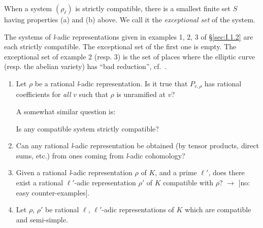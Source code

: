 When a system $(\rho_\ell)$ is strictly compatible, there is a
smallest finite set $S$ having properties (a) and (b) above.  We call
it the \emph{exceptional set} of the system.

\begin{examples}
The systems of \textit{l}-adic representations given in examples 1, 2,
3 of \S\ref{sec:I.1.2} are each strictly compatible.  The exceptional
set of the first one is empty.  The exceptional set of example 2
(resp. 3) is the set of places where the elliptic curve (resp. the
abelian variety) has ``bad reduction'', cf.~\cite{serre-tate-good}.
\end{examples}

\begin{enumerate}[label=\arabic*.,leftmargin=2.2em,itemsep=0.15ex,topsep=0.4ex]
\item Let $\rho$ be a rational \textit{l}-adic representation.  Is it
true that $P_{v,\rho}$ has rational coefficients for \emph{all} $v$
such that $\rho$ is unramified at $v$?

A somewhat similar question is:

Is any compatible system strictly compatible?

\item Can any rational \textit{l}-adic representation be obtained (by
tensor products, direct sums, etc.) from ones coming from
\textit{l}-adic cohomology?

\item Given a rational \textit{l}-adic representation $\rho$ of $K$,
and a prime $\ell'$, does there exist a rational $\ell'$-adic
representation $\rho'$ of $K$ compatible with $\rho$?
$\longrightarrow$ [no: easy counter-examples].

\item Let $\rho$, $\rho'$ be rational $\ell$, $\ell'$-adic
representations of $K$ which are compatible and semi-simple.


\end{enumerate}
